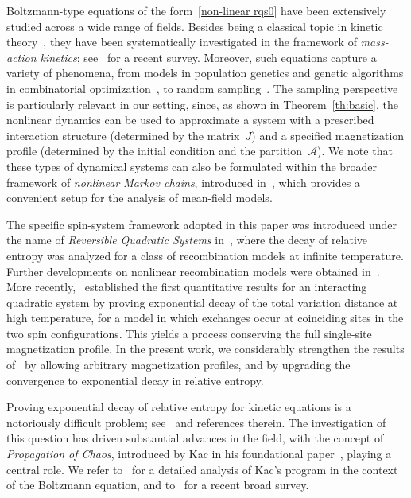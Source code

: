 \documentclass[11pt,reqno]{amsart}
\numberwithin{equation}{section}
\numberwithin{figure}{section}
\newcommand{\1}{\mathds{1}}
\begin{document}
Boltzmann-type equations of the form~\eqref{non-linear rqs0} have been extensively studied across a wide range of fields.  
Besides being a classical topic in kinetic theory~\cite{Vill1}, they have been systematically investigated in the framework of \emph{mass-action kinetics}; see~\cite{FeinbergBook} for a recent survey.  
Moreover, such equations capture a variety of phenomena, from models in population genetics and genetic algorithms in combinatorial optimization~\cite{goldberg,Mitchell}, to random sampling~\cite{Sinetal,Sinetal2,SV13}.  
The sampling perspective is particularly relevant in our setting, since, as shown in Theorem~\ref{th:basic}, the nonlinear dynamics can be used to approximate a system with a prescribed interaction structure (determined by the matrix~$J$) and a specified magnetization profile (determined by the initial condition and the partition~$\mathcal{A}$).
We note that these types of dynamical systems can also be formulated within the broader framework of \emph{nonlinear Markov chains}, introduced in~\cite{McKeanNLMC}, which provides a convenient setup for the analysis of mean-field models.  


The specific spin-system framework adopted in this paper was introduced under the name of \emph{Reversible Quadratic Systems} in~\cite{AC2018entropy}, where %
the decay of relative entropy was analyzed for a class of recombination models at infinite temperature.  
Further developments on nonlinear recombination models were obtained in~\cite{CP2024nonlinear,caputo2025cutoff}.  
More recently,~\cite{AC2024nonlinear} established the first quantitative results for an interacting quadratic system by proving exponential decay of the total variation distance at high temperature, for a model in which exchanges occur at coinciding sites in the two spin configurations.  
This yields a process conserving the full single-site magnetization profile.  
In the present work, we considerably strengthen the results of~\cite{AC2024nonlinear} by allowing arbitrary magnetization profiles, and by upgrading the convergence to exponential decay in relative entropy. 


Proving exponential decay of relative entropy for kinetic equations is a notoriously difficult problem; see~\cite{Vill2,entfound,kacsprog,Bonetto2018,Max} and references therein.  
The investigation of this question has driven substantial advances in the field, with the concept of \emph{Propagation of Chaos}, introduced by Kac in his foundational paper~\cite{KAC}, playing a central role.  
We refer to~\cite{kacsprog} for a detailed analysis of Kac's program in the context of the Boltzmann equation, and to~\cite{revchaos} for a recent broad survey.  
\end{document}
